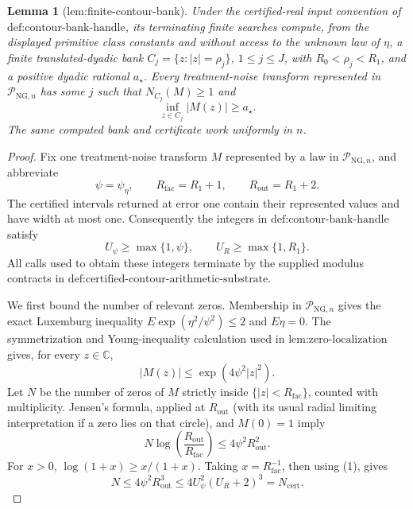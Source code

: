 \documentclass{article}
\newtheorem{lemma}{Lemma}
\begin{document}
\begin{lemma}[lem:finite-contour-bank]\label{lem:finite-contour-bank}
Under the certified-real input convention of \(\text{def:contour-bank-handle}\), its terminating finite searches compute, from the displayed primitive class constants and without access to the unknown law of \(\eta\), a finite translated-dyadic bank \(C_j=\{z:|z|=\rho_j\}\), \(1\le j\le J\), with \(R_0<\rho_j<R_1\), and a positive dyadic rational \(a_{\star}\). Every treatment-noise transform represented in \(\mathcal P_{\mathrm{NG},n}\) has some \(j\) such that \(N_{C_j}(M)\ge1\) and
\[
 \inf_{z\in C_j}|M(z)|\ge a_{\star}.
\]
The same computed bank and certificate work uniformly in \(n\).
\end{lemma}
\begin{proof}
Fix one treatment-noise transform \(M\) represented by a law in
\(\mathcal P_{\mathrm{NG},n}\), and abbreviate
\[
 \psi=\psi_{\eta},\qquad
 R_{\mathrm{fac}}=R_1+1,\qquad
 R_{\mathrm{out}}=R_1+2.
\]
The certified intervals returned at error one contain their represented
values and have width at most one.  Consequently the integers in
\(\text{def:contour-bank-handle}\) satisfy
\[
 U_{\psi}\ge\max\{1,\psi\},
 \qquad U_R\ge\max\{1,R_1\}.                                      \tag{1}
\]
All calls used to obtain these integers terminate by the supplied modulus
contracts in \(\text{def:certified-contour-arithmetic-substrate}\).

We first bound the number of relevant zeros.  Membership in
\(\mathcal P_{\mathrm{NG},n}\) gives the exact Luxemburg inequality
\(E\exp(\eta^2/\psi^2)\le2\) and \(E\eta=0\).  The symmetrization and
Young-inequality calculation used in \(\text{lem:zero-localization}\) gives,
for every \(z\in\mathbb C\),
\[
 |M(z)|\le \exp(4\psi^2|z|^2).                                    \tag{2}
\]
Let \(N\) be the number of zeros of \(M\) strictly inside
\(\{|z|<R_{\mathrm{fac}}\}\), counted with multiplicity.  Jensen's formula,
applied at \(R_{\mathrm{out}}\) (with its usual radial limiting
interpretation if a zero lies on that circle), and \(M(0)=1\) imply
\[
 N\log\!\left(\frac{R_{\mathrm{out}}}{R_{\mathrm{fac}}}\right)
 \le 4\psi^2R_{\mathrm{out}}^2.                                   \tag{3}
\]
For \(x>0\), \(\log(1+x)\ge x/(1+x)\).  Taking
\(x=R_{\mathrm{fac}}^{-1}\), then using (1), gives
\[
 N\le4\psi^2R_{\mathrm{out}}^3
 \le4U_{\psi}^2(U_R+2)^3=N_{\mathrm{cert}}.                       \tag{4}
\]


\end{proof}
\end{document}
